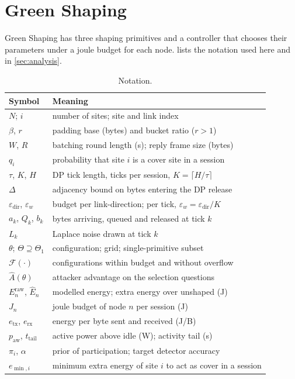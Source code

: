 \section{Green Shaping}\label{sec:design}

Green Shaping has three shaping primitives and a controller that chooses their parameters under a joule budget for each node.  lists the notation used here and in \cref{sec:analysis}.

\begin{table}[t]
\centering
\caption{Notation.}\label{tab:notation}
\footnotesize
\begin{tabular}{@{}ll@{}}
\toprule
Symbol & Meaning \\
\midrule
$N$; $i$ & number of sites; site and link index \\
$\beta$, $r$ & padding base (bytes) and bucket ratio ($r>1$) \\
$W$, $R$ & batching round length (s); reply frame size (bytes) \\
$q_i$ & probability that site $i$ is a cover site in a session \\
$\tau$, $K$, $H$ & DP tick length, ticks per session, $K=\lceil H/\tau\rceil$ \\
$\Delta$ & adjacency bound on bytes entering the DP release \\
$\varepsilon_{\mathrm{dir}}$, $\varepsilon_w$ & budget per link-direction; per tick, $\varepsilon_w=\varepsilon_{\mathrm{dir}}/K$ \\
$a_k$, $Q_k$, $b_k$ & bytes arriving, queued and released at tick $k$ \\
$L_k$ & Laplace noise drawn at tick $k$ \\
$\theta$; $\Theta\supseteq\Theta_1$ & configuration; grid; single-primitive subset \\
$\mathcal{F}(\cdot)$ & configurations within budget and without overflow \\
$\hat A(\theta)$ & attacker advantage on the selection questions \\
$E^{\mathrm{raw}}_n$, $\hat E_n$ & modelled energy; extra energy over unshaped (J) \\
$J_n$ & joule budget of node $n$ per session (J) \\
$e_{\mathrm{tx}}$, $e_{\mathrm{rx}}$ & energy per byte sent and received (J/B) \\
$p_{\mathrm{aw}}$, $t_{\mathrm{tail}}$ & active power above idle (W); activity tail (s) \\
$\pi_i$, $\alpha$ & prior of participation; target detector accuracy \\
$e_{\min,i}$ & minimum extra energy of site $i$ to act as cover in a session \\
\bottomrule
\end{tabular}
\end{table}

